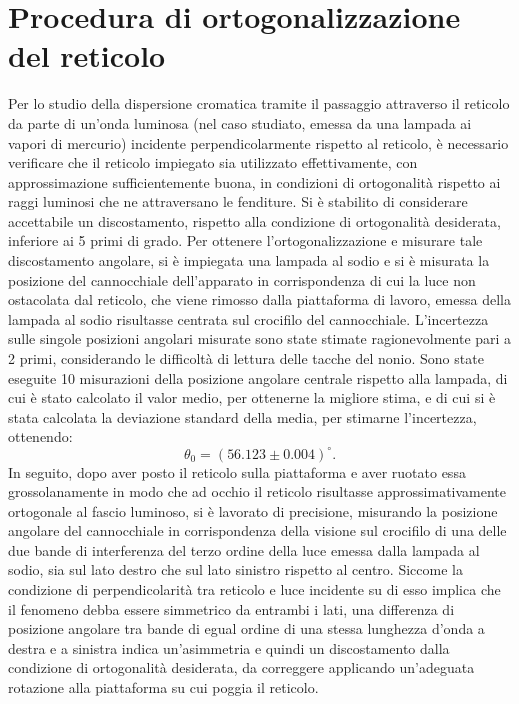\documentclass[a4paper,12pt]{article}
\begin{document}
\section{Procedura di ortogonalizzazione del reticolo }
\label{sec:ortogonalizzazione}
Per lo studio della dispersione cromatica tramite il passaggio attraverso il reticolo da parte di un’onda luminosa (nel caso studiato, emessa da una lampada ai vapori di mercurio) incidente perpendicolarmente rispetto al reticolo, è necessario verificare che il reticolo impiegato sia utilizzato effettivamente, con approssimazione sufficientemente buona, in condizioni di ortogonalità rispetto ai raggi luminosi che ne attraversano le fenditure. Si è stabilito di considerare accettabile un discostamento, rispetto alla condizione di ortogonalità desiderata, inferiore ai 5 primi di grado. Per ottenere l’ortogonalizzazione e misurare tale discostamento angolare, si è impiegata una lampada al sodio e si è misurata la posizione del cannocchiale dell’apparato in corrispondenza di cui la luce non ostacolata dal reticolo, che viene rimosso dalla piattaforma di lavoro, emessa della lampada al sodio risultasse centrata sul crocifilo del cannocchiale. L’incertezza sulle singole posizioni angolari misurate sono state stimate ragionevolmente pari a 2 primi, considerando le difficoltà di lettura delle tacche del nonio. Sono state eseguite 10 misurazioni della posizione angolare centrale rispetto alla lampada, di cui è stato calcolato il valor medio, per ottenerne la migliore stima, e di cui si è stata calcolata la deviazione standard della media, per stimarne l’incertezza, ottenendo: 
\[
\theta_0 = (56.123 \pm 0.004)^\circ.
\]
In seguito, dopo aver posto il reticolo sulla piattaforma e aver ruotato essa grossolanamente in modo che ad occhio il reticolo risultasse approssimativamente ortogonale al fascio luminoso, si è lavorato di precisione, misurando la posizione angolare del cannocchiale in corrispondenza della visione sul crocifilo di una delle due bande di interferenza del terzo ordine della luce emessa dalla lampada al sodio, sia sul lato destro che sul lato sinistro rispetto al centro. Siccome la condizione di perpendicolarità tra reticolo e luce incidente su di esso implica che il fenomeno debba essere simmetrico da entrambi i lati, una differenza di posizione angolare tra bande di egual ordine di una stessa lunghezza d’onda a destra e a sinistra indica un’asimmetria e quindi un discostamento dalla condizione di ortogonalità desiderata, da correggere applicando un’adeguata rotazione alla piattaforma su cui poggia il reticolo. 
\end{document}
